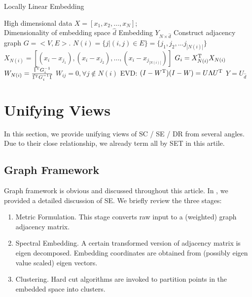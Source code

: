 \begin{algorithm}[htb]
	\caption{Locally Linear Embedding}
	\label{alg:lle}
	\begin{algorithmic}[1]
		\REQUIRE High dimensional data $X = [x_1, x_2, \ldots, x_N]$; \\
			Dimensionality of embedding space $ \hat{d} $
		\ENSURE Embedding $ Y_{N \times \hat{d}} $
		\STATE Construct adjacency graph $ G = <V, E> $.		
			\STATE $ N(i) = \{j | (i,j) \in E\} = \{ j_1,j_2, \ldots j_{|N(i)|}\} $
			\STATE $ X_{N(i)} =
			[(x_i - x_{j_1}), (x_i - x_{j_2}), \ldots, (x_i - x_{j_{|N(i)|}}) ] $
			\STATE $ G_i = X_{N(i)} ^\mathrm{T} X_{N(i)} $
			\STATE $ W_{N(i)} = \frac{\vec{1}^\mathrm{T} G_i^{-1}}{\vec{1}^\mathrm{T} G_i^{-1} \vec{1}} $
			\STATE $ W_{ij} = 0, \forall j \notin N(i) $
		\ENDFOR
		\STATE EVD: $ (I - W^\mathrm{T})(I - W) = U \Lambda U^\mathrm{T} $
		\STATE $ Y = U_{\hat{d}} $
	\end{algorithmic}
\end{algorithm}


\section{Unifying Views}
\label{sec:unify}

In this section, we provide unifying views of SC / SE / DR
from several angles. Due to their close relationship, 
we already term all by SET in this artile. 

\subsection{Graph Framework}
\label{sec:gfx}

Graph framework is obvious and discussed throughout this article. 
In \rsec{\ref{sec:framework}}, we provided a detailed discussion 
of SE. We briefly review the three stages:
\begin{enumerate}
	\item Metric Formulation. This stage converts raw input 
	to a (weighted) graph adjacency matrix. 
	\item Spectral Embedding. A certain transformed version of 
	adjacency matrix is eigen decomposed. Embedding coordinates
	are obtained from (possibly eigen value scaled) eigen vectors. 
	\item Clustering. Hard cut algorithms are invoked to 
	partition points in the embedded space into clusters.  
\end{enumerate}

